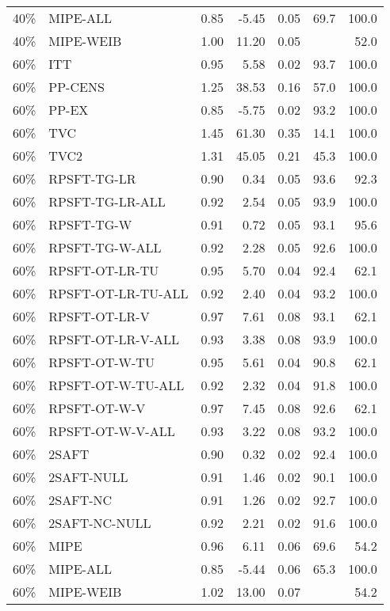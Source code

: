 \begin{table}[ht]
{\begin{tabular}{llrrrrr}
  40\% & MIPE-ALL & 0.85 & -5.45 & 0.05 & 69.7 & 100.0 \\ 
  40\% & MIPE-WEIB & 1.00 & 11.20 & 0.05 &  & 52.0 \\ 
   \hline
60\% & ITT & 0.95 & 5.58 & 0.02 & 93.7 & 100.0 \\ 
  60\% & PP-CENS & 1.25 & 38.53 & 0.16 & 57.0 & 100.0 \\ 
  60\% & PP-EX & 0.85 & -5.75 & 0.02 & 93.2 & 100.0 \\ 
  60\% & TVC & 1.45 & 61.30 & 0.35 & 14.1 & 100.0 \\ 
  60\% & TVC2 & 1.31 & 45.05 & 0.21 & 45.3 & 100.0 \\ 
   \hline
60\% & RPSFT-TG-LR & 0.90 & 0.34 & 0.05 & 93.6 & 92.3 \\ 
  60\% & RPSFT-TG-LR-ALL & 0.92 & 2.54 & 0.05 & 93.9 & 100.0 \\ 
  60\% & RPSFT-TG-W & 0.91 & 0.72 & 0.05 & 93.1 & 95.6 \\ 
  60\% & RPSFT-TG-W-ALL & 0.92 & 2.28 & 0.05 & 92.6 & 100.0 \\ 
  60\% & RPSFT-OT-LR-TU & 0.95 & 5.70 & 0.04 & 92.4 & 62.1 \\ 
  60\% & RPSFT-OT-LR-TU-ALL & 0.92 & 2.40 & 0.04 & 93.2 & 100.0 \\ 
  60\% & RPSFT-OT-LR-V & 0.97 & 7.61 & 0.08 & 93.1 & 62.1 \\ 
  60\% & RPSFT-OT-LR-V-ALL & 0.93 & 3.38 & 0.08 & 93.9 & 100.0 \\ 
   \hline
60\% & RPSFT-OT-W-TU & 0.95 & 5.61 & 0.04 & 90.8 & 62.1 \\ 
  60\% & RPSFT-OT-W-TU-ALL & 0.92 & 2.32 & 0.04 & 91.8 & 100.0 \\ 
  60\% & RPSFT-OT-W-V & 0.97 & 7.45 & 0.08 & 92.6 & 62.1 \\ 
  60\% & RPSFT-OT-W-V-ALL & 0.93 & 3.22 & 0.08 & 93.2 & 100.0 \\ 
   \hline
60\% & 2SAFT & 0.90 & 0.32 & 0.02 & 92.4 & 100.0 \\ 
  60\% & 2SAFT-NULL & 0.91 & 1.46 & 0.02 & 90.1 & 100.0 \\ 
  60\% & 2SAFT-NC & 0.91 & 1.26 & 0.02 & 92.7 & 100.0 \\ 
  60\% & 2SAFT-NC-NULL & 0.92 & 2.21 & 0.02 & 91.6 & 100.0 \\ 
  60\% & MIPE & 0.96 & 6.11 & 0.06 & 69.6 & 54.2 \\ 
  60\% & MIPE-ALL & 0.85 & -5.44 & 0.06 & 65.3 & 100.0 \\ 
  60\% & MIPE-WEIB & 1.02 & 13.00 & 0.07 &  & 54.2 \\ 
   \hline
\end{tabular}
}
\end{table}
